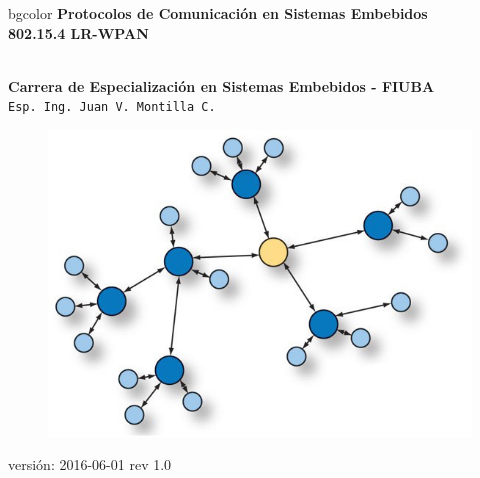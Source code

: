 \documentclass[aspectratio=169, handout]{beamer}
\begin{document}
\begingroup
\makeatletter
\setlength{\hoffset}{-.5\beamer@sidebarwidth}
\makeatother
\begin{frame}
\begin{center}
\hfill
    \begin{beamercolorbox}[center,dp=3ex,ht=10.25ex, wd=1\linewidth]{bgcolor}
        \Large\textbf{Protocolos de Comunicación en Sistemas Embebidos}\\
        \huge\textbf{802.15.4 LR-WPAN}
    \end{beamercolorbox}
\hfill\hfill
\\
\vspace{5px}
\textbf{Carrera de Especialización en Sistemas Embebidos - FIUBA}\\
\vspace{10px}
\texttt{Esp. Ing. Juan V. Montilla C.}\\

\vspace{10px}

\begin{figure}[H]
	\includegraphics[width=.3\textwidth]{./imagenes/red.jpg}
\end{figure}	

\vspace{5px}
\tiny versión: 2016-06-01 rev 1.0 
 	  	
\end{center}
\end{frame}
\endgroup
\end{document}
